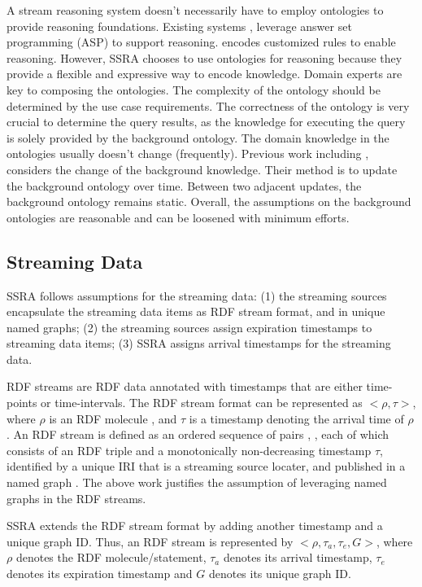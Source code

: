 A stream reasoning system doesn't necessarily have to employ ontologies to provide reasoning foundations. 
Existing systems \cite{do2011answer}, \cite{gebser2012stream} leverage answer set programming (ASP) \cite{gelfond1991classical} to support reasoning.
\cite{mileo2013streamrule} encodes customized rules to enable reasoning.   
However, SSRA chooses to use ontologies for reasoning because they provide a flexible and expressive way to encode knowledge. 
Domain experts are key to composing the ontologies. 
The complexity of the ontology should be determined by the use case requirements. 
The correctness of the ontology is very crucial to determine the query results, as the knowledge for executing the query is solely provided by the background ontology. 
The domain knowledge in the ontologies usually doesn't change (frequently). 
Previous work including \cite{gao2016planning}, \cite{ren2010towards} considers the change of the background knowledge.
Their method is to update the background ontology over time.
Between two adjacent updates, the background ontology remains static.
Overall, the assumptions on the background ontologies are reasonable and can be loosened with minimum efforts. 
%
\subsection{Streaming Data}
SSRA follows assumptions for the streaming data: 
(1) the streaming sources encapsulate the streaming data items as RDF stream format, and in unique named graphs;
(2) the streaming sources assign expiration timestamps to streaming data items;
(3) SSRA assigns arrival timestamps for the streaming data.

RDF streams \cite{della2009first} are RDF data annotated with timestamps that are either time-points or time-intervals.
The RDF stream format can be represented as $<\rho, \tau>$, where $\rho$ is an RDF molecule \cite{ding2005tracking}, and $\tau$ is a timestamp denoting the arrival time of $\rho$.
An RDF stream is defined as an ordered sequence of pairs \cite{barbieri2010proposal}, \cite{barbieri2009c}, each of which consists of an RDF triple and a monotonically non-decreasing timestamp $\tau$, identified by a unique IRI that is a streaming source locater, and published in a named graph \cite{carroll2005named}.
The above work justifies the assumption of leveraging named graphs in the RDF streams. 

SSRA extends the RDF stream format by adding another timestamp and a unique graph ID.
Thus, an RDF stream is represented by $<\rho,\tau_{a}, \tau_{e}, G>$, where $\rho$ denotes the RDF molecule/statement, $\tau_{a}$ denotes its arrival timestamp, $\tau_{e}$ denotes its expiration timestamp and $G$ denotes its unique graph ID.

